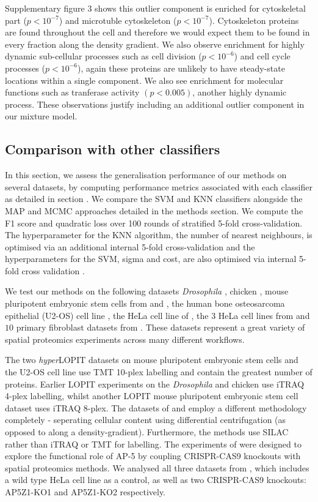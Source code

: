 \documentclass[10pt,letterpaper]{article}\usepackage[]{graphicx}\usepackage[]{color}
\begin{document}
Supplementary figure 3 shows this outlier component
is enriched for cytoskeletal part ($p <10^{-7}$) and microtuble
cytoskeleton ($p <10^{-7}$). Cytoskeleton proteins are found
throughout the cell and therefore we would expect them to be found in
every fraction along the density gradient. We also observe enrichment
for highly dynamic sub-cellular processes such as cell division
($p <10^{-6}$) and cell cycle processes ($p <10^{-6}$), again these
proteins are unlikely to have steady-state locations within a single
component. We also see enrichment for molecular functions such as
tranferase activity $(p < 0.005)$, another highly dynamic
process. These observations justify including an additional outlier
component in our mixture model.

\subsection*{Comparison with other classifiers}

In this section, we assess the generalisation performance of our
methods on several datasets, by computing performance metrics
associated with each classifier as detailed in section
. We compare the SVM and KNN classifiers
alongside the MAP and MCMC approaches detailed in the methods
section. We compute the F1 score and quadratic loss over 100 rounds of
stratified 5-fold cross-validation. The hyperparameter for the KNN
algorithm, the number of nearest neighbours, is optimised via an
additional internal 5-fold cross-validation and the hyperparameters
for the SVM, sigma and cost, are also optimised via internal 5-fold
cross validation \cite{svm:2010}.

We test our methods on the following datasets \textit{Drosophila}
\cite{Tan:2009}, chicken \cite{hall:2009}, mouse pluripotent
embryonic stem cells from \cite{hyper} and \cite{Breckels:2016}, the
human bone osteosarcoma epithelial (U2-OS) cell line
\cite{Thul:2017}, the HeLa cell line of \cite{Itzhak:2016}, the $3$
HeLa cell lines from \cite{Hirst:2018} and $10$ primary fibroblast
datasets from \cite{Jean_Beltran:2016}.  These datasets represent a
great variety of spatial proteomics experiments across many different
workflows.

The two \textit{hyper}LOPIT datasets on mouse pluripotent embryonic
stem cells and the U2-OS cell line use TMT 10-plex labelling and
contain the greatest number of proteins.  Earlier LOPIT experiments on
the \textit{Drosophila} and chicken use iTRAQ 4-plex labelling, whilst
another LOPIT mouse pluripotent embryonic stem cell dataset uses iTRAQ
8-plex. The datasets of \cite{Itzhak:2016} and \cite{Hirst:2018}
employ a different methodology completely - seperating cellular
content using differential centrifugation (as opposed to along a
density-gradient).  Furthermore, the methods use SILAC rather than
iTRAQ or TMT for labelling. The experiments of \cite{Hirst:2018} were
designed to explore the functional role of AP-5 by coupling
CRISPR-CAS9 knockouts with spatial proteomics methods. We analysed all
three datasets from \cite{Hirst:2018}, which includes a wild type HeLa
cell line as a control, as well as two CRISPR-CAS9 knockouts:
AP5Z1-KO1 and AP5Z1-KO2 respectively.
\end{document}
